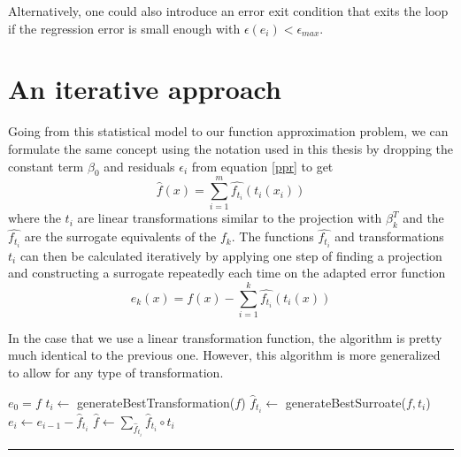 \documentclass[
  a4paper,  %
  twoside,  %
  bibliography=totoc,
  headsepline,
  cleardoublepage=empty,
  parskip=half,
  draft=false
]{scrbook}
\newcommand{\delimit}{{\color{charcoal}\noindent\rule{\textwidth}{1pt}}}
\begin{document}
Alternatively, one could also introduce an error exit condition that exits the loop if the regression error is small enough with $\epsilon(e_i) < \epsilon_{max}$.

\section{An iterative approach}

Going from this statistical model to our function approximation problem, we can formulate the same concept using the notation used in this thesis by dropping the constant term $\beta_0$ and residuals $\epsilon_i$ from equation \cref{ppr} to get
\begin{equation}
\hat{f}(x)=\sum_{i=1}^m \hat{f_{t_i}}(t_i(x_i))
\end{equation}
where the $t_i$ are linear transformations similar to the projection with $\beta_k^T$ and the $\hat{f_{t_i}}$ are the surrogate equivalents of the $f_k$.
The functions $\hat{f_{t_i}}$ and transformations $t_i$ can then be calculated iteratively by applying one step of finding a projection and constructing a surrogate repeatedly each time on the adapted error function
\begin{equation}
e_k(x)=f(x) - \sum_{i=1}^k \hat{f_{t_i}}(t_i(x))
\end{equation}

In the case that we use a linear transformation function, the algorithm is pretty much identical to the previous one.
However, this algorithm is more generalized to allow for any type of transformation.

\newpage
\begin{mdframed}[style=algstyle,frametitle={\textbf{function} \texttt{transformedSurrogateSum}{$(f, i_{\text{max}})$}}]
\normalsize
\vspace{5.5mm}
\begin{algorithmic}[1]
    \State $e_0 = f$
    	\State $t_i \gets$ generateBestTransformation($f$)
    	\State $\hat{f}_{t_i} \gets$ generateBestSurroate($f, t_i$)
    	\State $e_i \gets e_{i - 1} - \hat{f}_{t_i}$
    \EndFor
    \State $\hat{f} \gets \sum_{\hat{f}_{t_i}} \hat{f}_{t_i} \circ t_i$
    \State {}
\end{algorithmic}
\vspace{-1.5mm}
\delimit
	\label{alg:itappr}
\end{mdframed}
\end{document}
